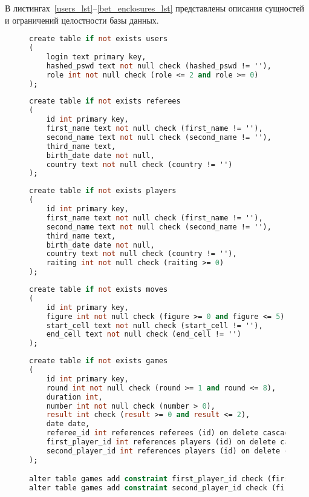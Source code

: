 В листингах~\ref{users_lst}--\ref{bet_enclosures_lst} представлены описания сущностей и ограничений целостности базы данных.
\begin{figure}[H]
	\begin{lstlisting}[label=users_lst,caption=Описание сущности users,language=Caml]
create table if not exists users
(
    login text primary key,
    hashed_pswd text not null check (hashed_pswd != ''),
    role int not null check (role <= 2 and role >= 0)
);
	\end{lstlisting}
\end{figure}
\begin{figure}[H]
	\begin{lstlisting}[label=referees_lst,caption=Описание сущности referees,language=Caml]
create table if not exists referees
(
    id int primary key,
    first_name text not null check (first_name != ''),
    second_name text not null check (second_name != ''),
    third_name text,
    birth_date date not null,
    country text not null check (country != '')
);
	\end{lstlisting}
\end{figure}
\begin{figure}[H]
	\begin{lstlisting}[label=players_lst,caption=Описание сущности players,language=Caml]
create table if not exists players
(
    id int primary key,
    first_name text not null check (first_name != ''),
    second_name text not null check (second_name != ''),
    third_name text,
    birth_date date not null,
    country text not null check (country != ''),
    raiting int not null check (raiting >= 0)
);
	\end{lstlisting}
\end{figure}
\begin{figure}[H]
	\begin{lstlisting}[label=moves_lst,caption=Описание сущности moves,language=Caml]
create table if not exists moves
(
    id int primary key,
    figure int not null check (figure >= 0 and figure <= 5),
    start_cell text not null check (start_cell != ''),
    end_cell text not null check (end_cell != '')
);
	\end{lstlisting}
\end{figure}
\begin{figure}[H]
	\begin{lstlisting}[label=games_lst,caption=Описание сущности games,language=Caml]
create table if not exists games
(
    id int primary key,
    round int not null check (round >= 1 and round <= 8),
    duration int,
    number int not null check (number > 0),
    result int check (result >= 0 and result <= 2),
    date date,
    referee_id int references referees (id) on delete cascade,
    first_player_id int references players (id) on delete cascade,
    second_player_id int references players (id) on delete cascade
);

alter table games add constraint first_player_id check (first_player_id != second_player_id);
alter table games add constraint second_player_id check (first_player_id != second_player_id);
	\end{lstlisting}
\end{figure}
